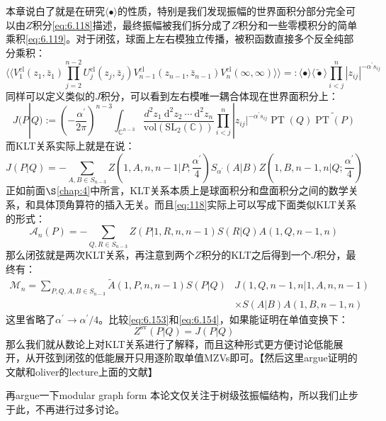 本章说白了就是在研究$\langle\bullet\rangle$的性质，特别是我们发现振幅的世界面积分部分完全可以由$Z$积分\ref{eq:6.118}描述，最终振幅被我们拆分成了$Z$积分和一些零模积分的简单乘积\ref{eq:6.119}。对于闭弦，球面上左右模独立传播，被积函数直接多个反全纯部分乘积：
\begin{equation}
		\langle\langle V_1^{\mathrm{cl}}(z_1,\bar z_1)\prod_{j=2}^{n-2}U_j^{\mathrm{cl}}(z_j,\bar z_j)V_{n-1}^{\mathrm{cl}}(z_{n-1},\bar z_{n-1})V_n^{\mathrm{cl}}(\infty,\infty)\rangle\rangle=:\langle\bullet\rangle\langle\widetilde\bullet\rangle\prod_{i<j}^n|z_{ij}|^{-\alpha^{\prime}s_{ij}}
\end{equation}
同样可以定义类似的$J$积分，可以看到左右模唯一耦合体现在世界面积分上：
\begin{equation}
	J(P|Q):=\left(-\frac{\alpha^{\prime}}{2\pi}\right)^{n-3}\int_{\mathbb{C}^{n-3}}\frac{d^2z_1\mathrm{~d}^2z_2\mathrm{~\cdots~d}^2z_n}{\mathrm{vol}(\mathrm{SL}_2(\mathbb{C}))}\prod_{i<j}^n|z_{ij}|^{-\alpha^{\prime}s_{ij}}\operatorname{PT}(Q)\widetilde{\operatorname{PT}(P)}
\end{equation}
而KLT关系实际上就是在说：
\begin{equation}
	J(P|Q)=-\sum_{A,B\in S_{n-3}}Z(1,A,n,n-1|P;\frac{\alpha^\prime}{4})S_{\alpha^{\prime}}(A|B)Z(1,B,n-1,n|Q;\frac{\alpha^\prime}{4})
\end{equation}
正如前面$\S$\ref{chap:4}中所言，KLT关系本质上是球面积分和盘面积分之间的数学关系，和具体顶角算符的插入无关。而且\ref{eq:118}实际上可以写成下面类似KLT关系的形式：\cite{Broedel:2013tta}
\begin{equation}
	\label{eq:6.153}
	\mathcal{A}_n(P)=-\sum_{Q,R\in S_{n-3}}Z(P|1,R,n,n-1)S(R|Q)A(1,Q,n-1,n)
\end{equation}
那么闭弦就是两次KLT关系，再注意到两个$Z$积分的KLT之后得到一个$J$积分，最终有：
\begin{equation}
	\label{eq:6.154}
\begin{aligned}
		\mathcal{M}_{n}=\sum_{P,Q,A,B\in S_{n-3}}\tilde{A}(1,P,n,n-1)S(P|Q)&J(1,Q,n-1,n|1,A,n,n-1)
	\\&\times S(A|B)A(1,B,n-1,n)
\end{aligned}
\end{equation}
这里省略了$\alpha^\prime\to\alpha^\prime/4$。比较\ref{eq:6.153}和\ref{eq:6.154}，如果能证明在单值变换下：
\begin{equation}
	Z^\mathrm{sv}(P|Q) = J(P|Q)
\end{equation}
那么我们就从数论上对KLT关系进行了解释，而且这种形式更方便讨论低能展开，从开弦到闭弦的低能展开只用逐阶取单值MZVs即可。【然后这里argue证明的文献和oliver的lecture上面的文献】

再argue一下modular graph form
本论文仅关注于树级弦振幅结构，所以我们止步于此，不再进行过多讨论。


